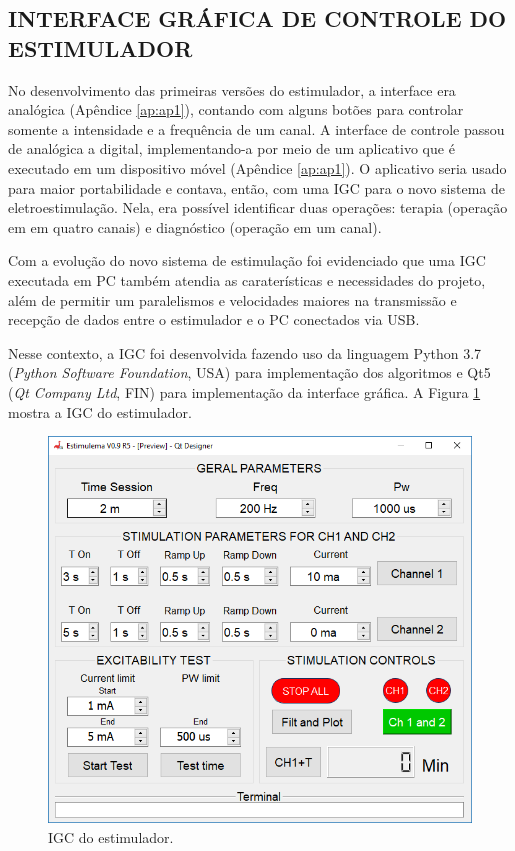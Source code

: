 \subsection{INTERFACE GRÁFICA DE CONTROLE DO ESTIMULADOR}
No desenvolvimento das primeiras versões do estimulador, a interface era analógica (Apêndice \ref{ap:ap1}), contando com alguns botões para controlar somente a intensidade e a frequência de um canal. A interface de controle passou de analógica a digital, implementando-a por meio de um aplicativo que é executado em um dispositivo móvel (Apêndice \ref{ap:ap1}). O aplicativo seria usado para maior portabilidade e contava, então, com uma \acrshort{IGC} para o novo sistema de eletroestimulação. Nela, era possível identificar duas operações: terapia (operação em em quatro canais) e diagnóstico (operação em um canal). 

Com a evolução do novo sistema de estimulação foi evidenciado que uma \acrshort{IGC} executada em \acrshort{PC} também atendia as caraterísticas e necessidades do projeto, além de permitir um paralelismos e velocidades maiores na transmissão e recepção de dados entre o estimulador e o \acrshort{PC} conectados via \acrshort{USB}. 

Nesse contexto, a \acrshort{IGC} foi desenvolvida fazendo uso da linguagem Python 3.7 (\textit{Python Software Foundation}, USA) para implementação dos algoritmos e Qt5 (\textit{Qt Company Ltd}, FIN) para implementação da interface gráfica. A Figura \ref{fig:c4_f30_igc} mostra a \acrshort{IGC} do estimulador.

\begin{figure}
    \centering %
    \includegraphics[width=1\linewidth]{figs/Fig_c4/c4_f30_igc}
    \caption{IGC do estimulador.}
    \label{fig:c4_f30_igc}
\end{figure}

